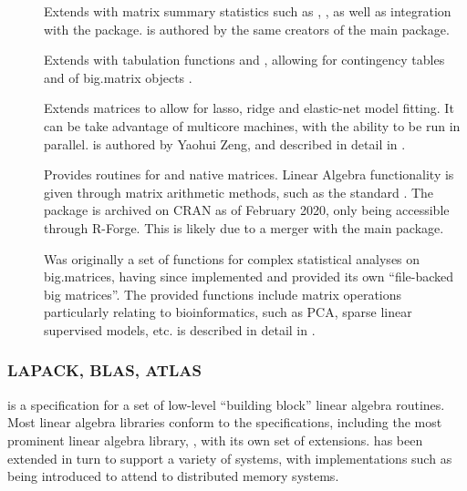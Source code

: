 \begin{description}
    \item[]
        Extends  with matrix summary statistics such as
        , , as well as integration with the 
        package\cite{emerson16}.  is authored by the same creators
        of the main  package.
    \item[]
        Extends  with tabulation functions and ,
        allowing for contingency tables and  of big.matrix
        objects \cite{kane16}.
    \item[]
        Extends  matrices to allow for lasso, ridge and elastic-net
        model fitting. It can be take advantage of multicore machines, with the
        ability to be run in parallel.  is authored by Yaohui Zeng, and
        described in detail in \textcite{zeng2017biglasso}.
    \item[]
        Provides  routines for  and native \R{} matrices. Linear
        Algebra functionality is given through matrix arithmetic methods, such
        as the standard . The package is archived
        on CRAN as of February 2020, only being accessible through R-Forge. This
        is likely due to a merger with the main  package.
    \item[]
        Was originally a set of functions for complex statistical analyses on
        big.matrices, having since implemented and provided its own
        ``file-backed big matrices''\cite{prive2018efficient}. The provided
        functions include matrix operations particularly relating to
        bioinformatics, such as PCA, sparse linear supervised models, etc.
         is described in detail in \textcite{prive2018efficient}.
\end{description}

\subsubsection{LAPACK, BLAS, ATLAS}\label{subsec:blas-lapack}

 is a specification for a set of low-level ``building block'' linear
algebra routines\cite{lawson1979basic}. Most linear algebra libraries
conform to the  specifications, including the most prominent linear
algebra library, , with its own set of
extensions\cite{demmel1989lapack}.  has been extended in turn to
support a variety of systems, with implementations such as 
being introduced to attend to distributed memory
systems\cite{choi1992scalapack}.

